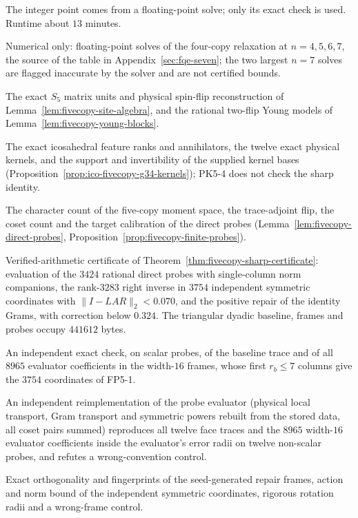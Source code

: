 \begin{description}
The integer point comes from a floating-point solve; only its exact check is used. Runtime about $13$ minutes.
\item[FS-0--FS-2] Numerical only: floating-point solves of the four-copy relaxation at $n=4,5,6,7$, the
source of the table in Appendix~\ref{sec:fqe-seven}; the two largest $n=7$ solves
are flagged inaccurate by the solver and are not certified bounds.
\item[S5-1, Y5-1] The exact $S_5$ matrix units and physical spin-flip reconstruction of Lemma~\ref{lem:fivecopy-site-algebra}, and the rational two-flip Young models of Lemma~\ref{lem:fivecopy-young-blocks}.
\item[IK5-1--IK5-4, PK5-1--PK5-4] The exact icosahedral feature ranks and annihilators, the twelve exact physical kernels, and the support and invertibility of the supplied kernel bases (Proposition~\ref{prop:ico-fivecopy-g34-kernels}); PK5-4 does not check the sharp identity.
\item[DP5-1] The character count of the five-copy moment space, the trace-adjoint flip, the coset count and the target calibration of the direct probes (Lemma~\ref{lem:fivecopy-direct-probes}, Proposition~\ref{prop:fivecopy-finite-probes}).
\item[FP5-1] Verified-arithmetic certificate of Theorem~\ref{thm:fivecopy-sharp-certificate}: evaluation of the $3424$ rational direct probes with single-column norm companions, the rank-$3283$ right inverse in $3754$ independent symmetric coordinates with $\|I-LAR\|_2<0.070$, and the positive repair of the identity Grams, with correction below $0.324$. The triangular dyadic baseline, frames and probes occupy $441612$ bytes.
\item[FP5-2] An independent exact check, on scalar probes, of the baseline trace and of all $8965$ evaluator coefficients in the width-$16$ frames, whose first $r_b\le7$ columns give the $3754$ coordinates of FP5-1.
\item[FP5-3] An independent reimplementation of the probe evaluator (physical local transport, Gram transport and
symmetric powers rebuilt from the stored data, all coset pairs summed) reproduces all twelve face traces and the $8965$
width-$16$ evaluator coefficients inside the evaluator's error radii on twelve non-scalar probes, and refutes a wrong-convention
control.
\item[FP5-4] Exact orthogonality and fingerprints of the seed-generated repair frames, action and norm bound of the independent symmetric coordinates, rigorous rotation radii and a wrong-frame control.

\end{description}
